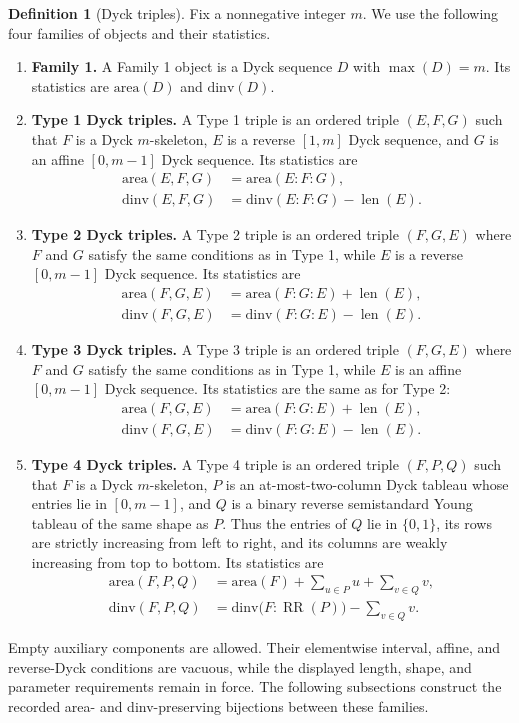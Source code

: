 \documentclass[11pt]{article}
\theoremstyle{plain}
\theoremstyle{definition}
\newtheorem{definition}[theorem]{Definition}
\theoremstyle{remark}
\newcommand{\dinv}{\mathrm{dinv}}
\newcommand{\area}{\mathrm{area}}
\begin{document}
\begin{definition}[Dyck triples]
\label{def:dyck-triples}
Fix a nonnegative integer \(m\).  We use the following four families of
objects and their statistics.
\begin{enumerate}[label=\textup{(\arabic*)}, wide]
\item \textbf{Family 1.}
A Family 1 object is a Dyck sequence \(D\) with \(\max(D)=m\).  Its statistics
are \(\area(D)\) and \(\dinv(D)\).
\item \textbf{Type 1 Dyck triples.}
A Type 1 triple is an ordered triple \((E,F,G)\) such that \(F\) is a Dyck
\(m\)-skeleton, \(E\) is a reverse \([1,m]\) Dyck sequence, and \(G\) is an
affine \([0,m-1]\) Dyck sequence.  Its statistics are
\[
\begin{aligned}
  \area(E,F,G)&=\area(E:F:G),\\
  \dinv(E,F,G)&=\dinv(E:F:G)-\operatorname{len}(E).
\end{aligned}
\]
\item \textbf{Type 2 Dyck triples.}
A Type 2 triple is an ordered triple \((F,G,E)\) where \(F\) and \(G\) satisfy
the same conditions as in Type 1, while \(E\) is a reverse \([0,m-1]\) Dyck
sequence.  Its statistics are
\[
\begin{aligned}
  \area(F,G,E)&=\area(F:G:E)+\operatorname{len}(E),\\
  \dinv(F,G,E)&=\dinv(F:G:E)-\operatorname{len}(E).
\end{aligned}
\]
\item \textbf{Type 3 Dyck triples.}
A Type 3 triple is an ordered triple \((F,G,E)\) where \(F\) and \(G\) satisfy
the same conditions as in Type 1, while \(E\) is an affine \([0,m-1]\) Dyck
sequence.  Its statistics are the same as for Type 2:
\[
\begin{aligned}
  \area(F,G,E)&=\area(F:G:E)+\operatorname{len}(E),\\
  \dinv(F,G,E)&=\dinv(F:G:E)-\operatorname{len}(E).
\end{aligned}
\]
\item \textbf{Type 4 Dyck triples.}
A Type 4 triple is an ordered triple \((F,P,Q)\) such that \(F\) is a Dyck
\(m\)-skeleton, \(P\) is an at-most-two-column Dyck tableau whose entries lie
in \([0,m-1]\), and \(Q\) is a binary reverse semistandard Young tableau of
the same shape as \(P\).  Thus the entries of \(Q\) lie in \(\{0,1\}\), its rows
are strictly increasing from left to right, and its columns are weakly
increasing from top to bottom.  Its statistics are
\[
\begin{aligned}
  \area(F,P,Q)&=\area(F)+\sum_{u\in P}u+\sum_{v\in Q}v,\\
  \dinv(F,P,Q)&=\dinv\bigl(F:\operatorname{RR}(P)\bigr)-\sum_{v\in Q}v.
\end{aligned}
\]
\end{enumerate}
Empty auxiliary components are allowed.  Their elementwise interval, affine,
and reverse-Dyck conditions are vacuous, while the displayed length, shape,
and parameter requirements remain in force.  The following subsections
construct the recorded area- and dinv-preserving bijections between these
families.
\end{definition}
\end{document}
